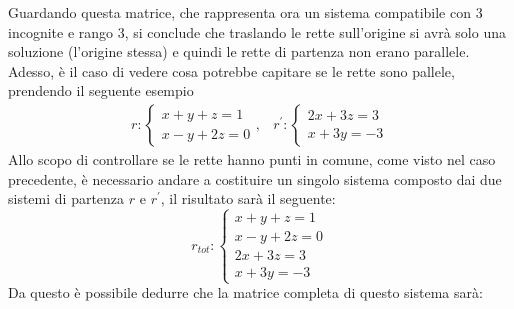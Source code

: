 Guardando questa matrice, che rappresenta ora un sistema compatibile con 3 incognite e rango 3, si
conclude che traslando le rette sull'origine si avrà solo una soluzione (l'origine stessa) e quindi le
rette di partenza non erano parallele.\\
Adesso, è il caso di vedere cosa potrebbe capitare se le rette sono pallele, prendendo il seguente
esempio
\begin{eqnarray}
  \label{eq:qualcheappgeo6}
  r:
  \begin{cases}
    x+y+z=1\\
    x-y+2z=0
  \end{cases}, & r^\prime:
                 \begin{cases}
                   2x+3z=3\\
                   x+3y=-3
                 \end{cases}
\end{eqnarray}
Allo scopo di controllare se le rette hanno punti in comune, come visto nel caso precedente, è
necessario andare a costituire un singolo sistema composto dai due sistemi di partenza $r$ e $r^\prime$,
il risultato sarà il seguente:
\begin{equation*}
    r_{tot}:
  \begin{cases}
    x+y+z=1\\
    x-y+2z=0\\
    2x+3z=3\\
    x+3y=-3
  \end{cases}
\end{equation*}
Da questo è possibile dedurre che la matrice completa di questo sistema sarà:
